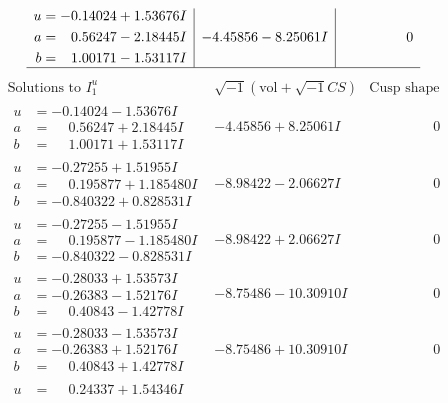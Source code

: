 \documentclass[1p]{elsarticle_modified}
\theoremstyle{definition}
\newcommand{\I}{\sqrt{-1}}
\begin{document}
$$\begin{array}{c|c|c}
\begin{aligned}
u &= -0.14024 + 1.53676 I \\
a &= \phantom{-}0.56247 - 2.18445 I \\
b &= \phantom{-}1.00171 - 1.53117 I\end{aligned}
 & -4.45856 - 8.25061 I & \phantom{-0.000000 } 0\\
 \hline 
 \end{array}$$\newpage$$\begin{array}{c|c|c}  
\text{Solutions to }I^u_{1}& \I (\text{vol} + \sqrt{-1}CS) & \text{Cusp shape}\\
 \hline 
\begin{aligned}
u &= -0.14024 - 1.53676 I \\
a &= \phantom{-}0.56247 + 2.18445 I \\
b &= \phantom{-}1.00171 + 1.53117 I\end{aligned}
 & -4.45856 + 8.25061 I & \phantom{-0.000000 } 0 \\ \hline\begin{aligned}
u &= -0.27255 + 1.51955 I \\
a &= \phantom{-}0.195877 + 1.185480 I \\
b &= -0.840322 + 0.828531 I\end{aligned}
 & -8.98422 - 2.06627 I & \phantom{-0.000000 } 0 \\ \hline\begin{aligned}
u &= -0.27255 - 1.51955 I \\
a &= \phantom{-}0.195877 - 1.185480 I \\
b &= -0.840322 - 0.828531 I\end{aligned}
 & -8.98422 + 2.06627 I & \phantom{-0.000000 } 0 \\ \hline\begin{aligned}
u &= -0.28033 + 1.53573 I \\
a &= -0.26383 - 1.52176 I \\
b &= \phantom{-}0.40843 - 1.42778 I\end{aligned}
 & -8.75486 - 10.30910 I & \phantom{-0.000000 } 0 \\ \hline\begin{aligned}
u &= -0.28033 - 1.53573 I \\
a &= -0.26383 + 1.52176 I \\
b &= \phantom{-}0.40843 + 1.42778 I\end{aligned}
 & -8.75486 + 10.30910 I & \phantom{-0.000000 } 0 \\ \hline\begin{aligned}
u &= \phantom{-}0.24337 + 1.54346 I \\

\end{aligned}
\end{array}$$
\end{document}
